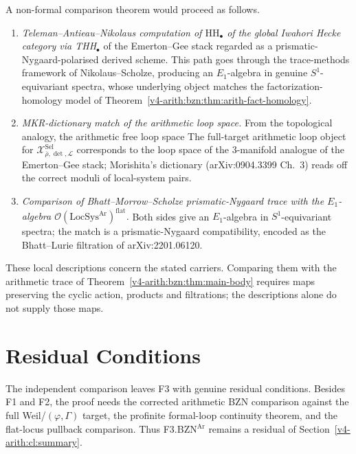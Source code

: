 \begin{remark}
\label{v4-arith:bzn:rem:verification-sketch}
A non-formal comparison theorem would proceed as follows.
\begin{enumerate}
\item \emph{Teleman--Antieau--Nikolaus computation of
\(\mathrm{HH}_{\bullet}\) of the global Iwahori Hecke category via
THH\(_{\bullet}\)} of the Emerton--Gee stack regarded as a
prismatic-Nygaard-polarised derived scheme. This path goes through
the trace-methods framework of Nikolaus--Scholze, producing an
\(E_{1}\)-algebra in genuine \(S^{1}\)-equivariant spectra, whose
underlying object matches the factorization-homology model of
Theorem~\ref{v4-arith:bzn:thm:arith-fact-homology}.
\item \emph{MKR-dictionary match of the arithmetic loop space.}
From the topological analogy, the arithmetic free loop space
The full-target arithmetic loop object for
\(\mathcal{X}^{\mathrm{Sel}}_{\bar\rho,\det,\mathcal{L}}\) corresponds
to the loop space of the \(3\)-manifold analogue of the Emerton--Gee
stack; Morishita's dictionary (arXiv:0904.3399 Ch.~3) reads
off the correct moduli of local-system pairs.
\item \emph{Comparison of Bhatt--Morrow--Scholze prismatic-Nygaard
trace with the \(E_{1}\)-algebra \(\mathcal{O}(\mathrm{LocSys}^{\mathrm{Ar}})^{\mathrm{flat}}\).}
Both sides give an \(E_{1}\)-algebra in \(S^{1}\)-equivariant spectra;
the match is a prismatic-Nygaard compatibility, encoded as the
Bhatt--Lurie filtration of arXiv:2201.06120.
\end{enumerate}
These local descriptions concern the stated carriers. Comparing them
with the arithmetic trace of Theorem~\ref{v4-arith:bzn:thm:main-body}
requires maps preserving the cyclic action, products and filtrations;
the descriptions alone do not supply those maps.
\end{remark}

\section{Residual Conditions}
\label{v4-arith:bzn:residual}

The independent comparison leaves F3 with genuine residual conditions.
Besides F1 and F2, the proof needs the corrected arithmetic BZN
comparison against the full Weil/\((\varphi,\Gamma)\) target, the
profinite formal-loop continuity theorem, and the flat-locus
pullback comparison. Thus F3.BZN\(^{\mathrm{Ar}}\) remains a residual
of Section~\ref{v4-arith:cl:summary}.

